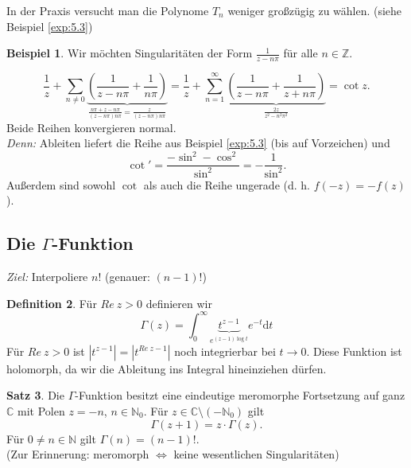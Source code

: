 \documentclass[11pt,titlepage]{article}
\theoremstyle{definition}
\newtheorem{theorem}{Satz}[section]
\newtheorem{definition}[theorem]{Definition}
\newtheorem{example}[theorem]{Beispiel}
\theoremstyle{remark}
\begin{document}
	In der Praxis versucht man die Polynome $T_n$ weniger großzügig zu wählen. (siehe Beispiel \ref{exp:5.3})
	
	\begin{example}
		Wir möchten Singularitäten der Form $\frac{1}{z-n\pi}$ für alle $n\in\mathbb{Z}$.
		
		
		
		
		\[ \frac{1}{z}+\sum_{n\neq 0} \underbrace{\left(\frac{1}{z-n\pi}+\frac{1}{n\pi}\right)}_{\frac{n\pi +z-n\pi}
		{(z-n\pi)n\pi}=\frac{z}{(z-n\pi)n\pi}} 
		= \frac{1}{z}+\sum_{n=1}^{\infty} \underbrace{\left( \frac{1}{z-n\pi}+\frac{1}{z+n\pi}\right)}_
		{\frac{2z}{z^2 -n^2\pi^2}} =\cot z. \]
		Beide Reihen konvergieren normal. \\
		\textsl{Denn:} Ableiten liefert die Reihe aus Beispiel \ref{exp:5.3} (bis auf Vorzeichen) und
		\[ \cot' =\frac{-\sin^2 -\cos^2}{\sin^2}=-\frac{1}{\sin^2}.\]
		Außerdem sind sowohl $\cot$ als auch die Reihe ungerade (d. h. $f(-z)=-f(z)$).
	\end{example}
	
	\subsection{Die $\Gamma$-Funktion}
	
	\textsl{Ziel:} Interpoliere $n!$ (genauer: $(n-1)!$)
	
	\begin{definition}
		Für $Re\ z>0$ definieren wir
		\[ \Gamma(z) =\int_0^{\infty} \underbrace{t^{z-1}}_{e^{(z-1)\log t}}e^{-t}\mathrm{d}t \]
		Für $Re\ z>0$ ist $|t^{z-1}|=|t^{Re\ z-1}|$ noch integrierbar bei $t\to 0$. Diese Funktion ist holomorph, da 
		wir die Ableitung ins Integral hineinziehen dürfen.
	\end{definition}
	
	\begin{theorem} \label{thm:Gamma}
		Die $\Gamma$-Funktion besitzt eine eindeutige meromorphe Fortsetzung auf ganz $\mathbb{C}$ mit Polen 
		$z=-n$, $n\in\mathbb{N}_0$. Für $z\in\mathbb{C}\setminus (-\mathbb{N}_0)$ gilt 
		\[ \Gamma(z+1)=z\cdot \Gamma(z). \]
		Für $0\neq n\in\mathbb{N}$ gilt $\Gamma(n)=(n-1)!$. \\
		(Zur Erinnerung: meromorph $\Leftrightarrow$ keine wesentlichen Singularitäten)
	\end{theorem}
	
\end{document}
